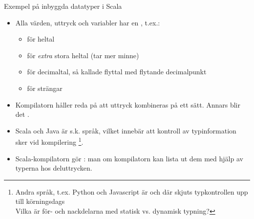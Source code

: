 \begin{Slide}{Exempel på inbyggda datatyper i Scala}\SlideFontSmall
\begin{itemize}
\item Alla värden, uttryck och variabler har en \href{https://sv.wikipedia.org/wiki/Datatyp}{}, t.ex.:
\begin{itemize}\footnotesize
\item {} för heltal
\item {} för \textit{extra} stora heltal (tar mer minne)
\item {} för decimaltal, så kallade flyttal med flytande decimalpunkt
\item {} för strängar
\end{itemize}

\item Kompilatorn håller reda på att uttryck kombineras på ett  sätt. Annars blir det .

\item Scala och Java är s.k. \href{https://sv.wikipedia.org/wiki/Typsystem}{} språk, vilket innebär att kontroll av typinformation sker vid kompilering \footnote{Andra språk, t.ex. Python och Javascript är  och där skjuts typkontrollen upp till körningsdags  \\ Vilka är för- och nackdelarna med statisk vs. dynamisk typning?}.

\item Scala-kompilatorn gör \href{https://en.wikipedia.org/wiki/Type_inference}{}: man  om kompilatorn kan lista ut dem med hjälp av typerna hos deluttrycken.

\end{itemize}
\end{Slide}


